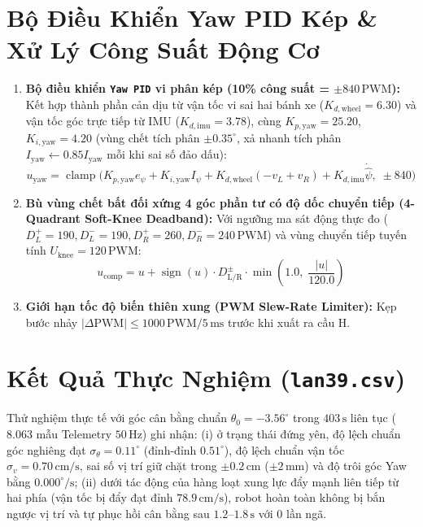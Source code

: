 \documentclass[10pt,a4paper,twocolumn]{article}
\begin{document}
\section{Bộ Điều Khiển Yaw PID Kép \& Xử Lý Công Suất Động Cơ}
\begin{enumerate}
    \item \textbf{Bộ điều khiển \texttt{Yaw PID} vi phân kép (10\% công suất = $\pm 840\,\text{PWM}$):} Kết hợp thành phần cản dịu từ vận tốc vi sai hai bánh xe ($K_{d,\text{wheel}} = 6.30$) và vận tốc góc trực tiếp từ IMU ($K_{d,\text{imu}} = 3.78$), cùng $K_{p,\text{yaw}} = 25.20$, $K_{i,\text{yaw}} = 4.20$ (vùng chết tích phân $\pm 0.35^\circ$, xả nhanh tích phân $I_{\text{yaw}} \leftarrow 0.85 I_{\text{yaw}}$ mỗi khi sai số đảo dấu):
    \begin{equation}
        u_{\text{yaw}} = \operatorname{clamp}\!\big(K_{p,\text{yaw}} e_\psi + K_{i,\text{yaw}} I_\psi + K_{d,\text{wheel}}(-v_L + v_R) + K_{d,\text{imu}}\dot{\hat{\psi}},\; \pm 840\big)
    \end{equation}
    \item \textbf{Bù vùng chết bất đối xứng 4 góc phần tư có độ dốc chuyển tiếp (4-Quadrant Soft-Knee Deadband):} Với ngưỡng ma sát động thực đo ($D_L^+ = 190, D_L^- = 190, D_R^+ = 260, D_R^- = 240\,\text{PWM}$) và vùng chuyển tiếp tuyến tính $U_{\text{knee}} = 120\,\text{PWM}$:
    \begin{equation}
        u_{\text{comp}} = u + \operatorname{sign}(u) \cdot D_{\text{L/R}}^{\pm} \cdot \min\!\left(1.0,\; \frac{|u|}{120.0}\right)
    \end{equation}
    \item \textbf{Giới hạn tốc độ biến thiên xung (PWM Slew-Rate Limiter):} Kẹp bước nhảy $|\Delta\text{PWM}| \le 1000\,\text{PWM}/5\,\text{ms}$ trước khi xuất ra cầu H.
\end{enumerate}

\section{Kết Quả Thực Nghiệm (\texttt{lan39.csv})}
Thử nghiệm thực tế với góc cân bằng chuẩn $\theta_0 = -3.56^\circ$ trong $403\,\text{s}$ liên tục ($8.063$ mẫu Telemetry $50\,\text{Hz}$) ghi nhận: (i) ở trạng thái đứng yên, độ lệch chuẩn góc nghiêng đạt $\sigma_\theta = 0.11^\circ$ (đỉnh-đỉnh $0.51^\circ$), độ lệch chuẩn vận tốc $\sigma_v = 0.70\,\text{cm/s}$, sai số vị trí giữ chặt trong $\pm 0.2\,\text{cm}$ ($\pm 2\,\text{mm}$) và độ trôi góc Yaw bằng $0.000^\circ/\text{s}$; (ii) dưới tác động của hàng loạt xung lực đẩy mạnh liên tiếp từ hai phía (vận tốc bị đẩy đạt đỉnh $78.9\,\text{cm/s}$), robot hoàn toàn không bị bắn ngược vị trí và tự phục hồi cân bằng sau $1.2\text{--}1.8\,\text{s}$ với 0 lần ngã.
\end{document}
